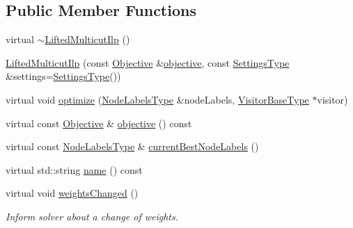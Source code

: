 \subsection*{Public Member Functions}
\begin{DoxyCompactItemize}
\item 
virtual \hyperlink{classnifty_1_1graph_1_1optimization_1_1lifted__multicut_1_1LiftedMulticutIlp_a6bb7a56be46045e0443c5b9b34725f0d}{$\sim$\+Lifted\+Multicut\+Ilp} ()
\item 
\hyperlink{classnifty_1_1graph_1_1optimization_1_1lifted__multicut_1_1LiftedMulticutIlp_ae8c4958e9b5c0cdf57c5a053e20ddecc}{Lifted\+Multicut\+Ilp} (const \hyperlink{classnifty_1_1graph_1_1optimization_1_1lifted__multicut_1_1LiftedMulticutIlp_acde6c20c80ff731341a83218d4c6fcd7}{Objective} \&\hyperlink{classnifty_1_1graph_1_1optimization_1_1lifted__multicut_1_1LiftedMulticutIlp_a0142ae8d77ea11da027dcbe052a33a93}{objective}, const \hyperlink{structnifty_1_1graph_1_1optimization_1_1lifted__multicut_1_1LiftedMulticutIlp_1_1SettingsType}{Settings\+Type} \&settings=\hyperlink{structnifty_1_1graph_1_1optimization_1_1lifted__multicut_1_1LiftedMulticutIlp_1_1SettingsType}{Settings\+Type}())
\item 
virtual void \hyperlink{classnifty_1_1graph_1_1optimization_1_1lifted__multicut_1_1LiftedMulticutIlp_ad5f80c96231f9ef3f9c4469ffac1c35f}{optimize} (\hyperlink{classnifty_1_1graph_1_1optimization_1_1lifted__multicut_1_1LiftedMulticutIlp_ac01a83852272468cca5c54bf5f2d4f80}{Node\+Labels\+Type} \&node\+Labels, \hyperlink{classnifty_1_1graph_1_1optimization_1_1lifted__multicut_1_1LiftedMulticutIlp_a2e08b1b4250ea071d1ecb321e1fd5c06}{Visitor\+Base\+Type} $\ast$visitor)
\item 
virtual const \hyperlink{classnifty_1_1graph_1_1optimization_1_1lifted__multicut_1_1LiftedMulticutIlp_acde6c20c80ff731341a83218d4c6fcd7}{Objective} \& \hyperlink{classnifty_1_1graph_1_1optimization_1_1lifted__multicut_1_1LiftedMulticutIlp_a0142ae8d77ea11da027dcbe052a33a93}{objective} () const 
\item 
virtual const \hyperlink{classnifty_1_1graph_1_1optimization_1_1lifted__multicut_1_1LiftedMulticutIlp_ac01a83852272468cca5c54bf5f2d4f80}{Node\+Labels\+Type} \& \hyperlink{classnifty_1_1graph_1_1optimization_1_1lifted__multicut_1_1LiftedMulticutIlp_a34185537536fd6a17d21b0d45490dcf4}{current\+Best\+Node\+Labels} ()
\item 
virtual std\+::string \hyperlink{classnifty_1_1graph_1_1optimization_1_1lifted__multicut_1_1LiftedMulticutIlp_a4ba284855caaecba619ae4a5296a1d34}{name} () const 
\item 
virtual void \hyperlink{classnifty_1_1graph_1_1optimization_1_1lifted__multicut_1_1LiftedMulticutIlp_a1e1d76eef565989832313b1488120870}{weights\+Changed} ()
\begin{DoxyCompactList}\small\item\em Inform solver about a change of weights. \end{DoxyCompactList}\end{DoxyCompactItemize}


